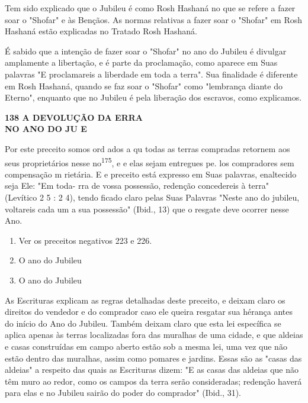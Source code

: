 \begin{itemize}
\begin{enumrate}
\begin{itemize}
\begin{itemize}
\begin{itemize}
Tem sido explicado que o Jubileu é como Rosh Hashaná no que se refere a
fazer soar o "Shofar" e às Bençãos. As normas relativas a fazer soar o
"Shofar" em Rosh Hashaná estão explicadas no Tratado Rosh Hashaná.

É sabido que a intenção de fazer soar o "Shofar" no ano do Jubileu é
divulgar amplamente a libertação, e é parte da proclamação, como aparece
em Suas palavras "E proclamareis a liberdade em toda a terra". Sua
finalidade é diferente em Rosh Hashaná, quando se faz soar o "Shofar"
como "lembrança diante do Eterno", enquanto que no Jubileu é pela
liberação dos escravos, co­mo explicamos.


\textbf{138 A DEVOLUÇÃO DA ERRA\\
NO ANO DO JU E}


Por este preceito somos ord ados a qu todas as terras compradas retornem
aos seus proprietários nesse no\textsuperscript{175}, e e elas sejam
entregues pe­. los compradores sem compensação m rietária. E e preceito
está expresso em Suas palavras, enaltecido seja Ele: "Em toda- rra de
vossa possessão, reden­ção concedereis à terra" (Levítico 2 5 : 2 4),
tendo ficado claro pelas Suas Pala­vras "Neste ano do jubileu, voltareis
cada um a sua possessão" (Ibid., 13) que o resgate deve ocorrer nesse
Ano.


\begin{enumerate}
\def\labelenumi{\arabic{enumi}.}
\setcounter{enumi}{172}
\item
 
 Ver os preceitos negativos 223 e 226.
 
\item
 
 O ano do Jubileu
 
\item
 
 O ano do Jubileu
 
\end{enumerate}

As Escrituras explicam as regras detalhadas deste preceito, e deixam
claro os direitos do vendedor e do comprador caso ele queira resgatar
sua hé­rança antes do início do Ano do Jubileu. Também deixam claro que
esta lei es­pecífica se aplica apenas às terras localizadas fora das
muralhas de uma cidade, e que aldeias e casas construídas em campo
aberto estão sob a mesma lei, uma vez que não estão dentro das muralhas,
assim como pomares e jardins. Essas são as "casas das aldeias" a
respeito das quais as Escrituras dizem: "E as casas das aldeias que não
têm muro ao redor, como os campos da terra serão consi­deradas; redenção
haverá para elas e no Jubileu sairão do poder do compra­dor" (Ibid.,
31).


\end{itemize}
\end{itemize}
\end{itemize}
\end{enumrate}
\end{itemize}
